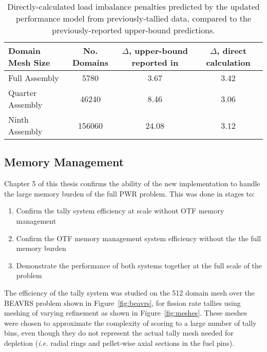 \documentclass[12pt,twoside]{mitthesis-exec}
\begin{document}
\begin{table}[h]
    \centering
    \caption{Directly-calculated load imbalance penalties predicted by the
    updated performance model from previously-tallied data, compared to the
    previously-reported upper-bound predictions. \label{tbl:model_ver_direct}}
  \begin{tabular}{l c c c}
    \hline
    Domain Mesh Size & No. Domains & \pbox{20cm}{$\Delta$, upper-bound \\ reported in
    \cite{Siegel2}} & \pbox{20cm}{$\Delta$, direct \\calculation} \\ \hline
    Full Assembly &  5780       & 3.67                 & 3.42           \\
    Quarter Assembly      &  46240      & 8.46                 & 3.06           \\
    Ninth Assembly         &  156060     & 24.08                 & 3.12           \\ \hline
  \end{tabular}
\end{table}

\subsection*{Memory Management}

Chapter 5 of this thesis confirms the ability of the new implementation to
handle the large memory burden of the full PWR problem. This was done in stages
to:

\begin{enumerate}
  \item Confirm the tally system efficiency at scale without OTF memory management
  \item Confirm the OTF memory management system efficiency without the the full
  memory burden
  \item Demonstrate the performance of both systems together at the full scale
  of the problem
\end{enumerate}

The efficiency of the tally system was studied on the 512 domain mesh over the
BEAVRS problem shown in Figure~\ref{fig:beavrs}, for fission rate tallies using
meshing of varying refinement as shown in Figure~\ref{fig:meshes}. These meshes
were chosen to approximate the complexity of scoring to a large number of tally
bins, even though they do not represent the actual tally mesh needed for
depletion (\emph{i.e.} radial rings and pellet-wise axial sections in the fuel
pins).
\end{document}

